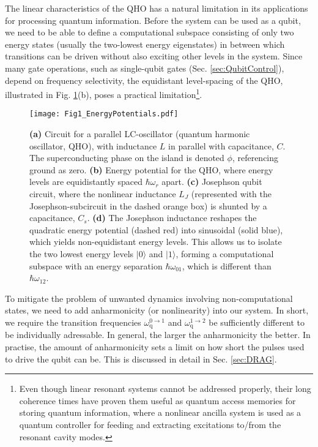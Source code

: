 \documentclass[aip,apr,twocolumn,showpacs,superscriptaddress,groupedaddress,nofootinbib,reprint]{revtex4-1}  %
\begin{document}
The linear characteristics of the QHO has a natural limitation in its applications for processing quantum information. Before the system can be used as a qubit, we need to be able to define a computational subspace consisting of only two energy states (usually the two-lowest energy eigenstates) in between which transitions can be driven without also exciting other levels in the system. Since many gate operations, such as single-qubit gates (Sec. \ref{sec:QubitControl}), depend on frequency selectivity, the equidistant level-spacing of the QHO, illustrated in Fig. \ref{Fig:EnergyPotentials}(b), poses a practical limitation\footnote{Even though linear resonant systems cannot be addressed properly, their long coherence times have proven them useful as quantum access memories for storing quantum information, where a nonlinear ancilla system is used as a quantum controller for feeding and extracting excitations to/from the resonant cavity modes\cite{Naik2017}.}.

\begin{figure}[t!]
\begin{center}
\texttt{[image: Fig1\_EnergyPotentials.pdf]}
\caption{\textbf{(a)} Circuit for a parallel LC-oscillator (quantum harmonic oscillator, QHO), with inductance $L$ in parallel with capacitance, $C$. The superconducting phase on the island is denoted $\phi$, referencing ground as zero. \textbf{(b)} Energy potential for the QHO, where energy levels are equidistantly spaced $\hbar \omega_{r}$ apart. \textbf{(c)} Josephson qubit circuit, where the nonlinear inductance $L_J$ (represented with the Josephson-subcircuit in the dashed orange box) is shunted by a capacitance, $C_s$. \textbf{(d)} The Josephson inductance reshapes the quadratic energy potential (dashed red) into sinusoidal (solid blue), which yields non-equidistant energy levels. This allows us to isolate the two lowest energy levels $|0\rangle$ and $|1\rangle$, forming a computational subspace with an energy separation $\hbar\omega_{01}$, which is different than $\hbar\omega_{12}$.}
\label{Fig:EnergyPotentials}
\end{center}
\end{figure}

To mitigate the problem of unwanted dynamics involving non-computational states, we need to add anharmonicity (or nonlinearity) into our system. In short, we require the transition frequencies $\omega_{\text{q}}^{0\rightarrow 1}$ and $\omega_{\text{q}}^{1\rightarrow 2}$ be sufficiently different to be individually adressable. In general, the larger the anharmonicity the better. In practise, the amount of anharmonicity sets a limit on how short the pulses used to drive the qubit can be. This is discussed in detail in Sec. \ref{sec:DRAG}.
\end{document}
